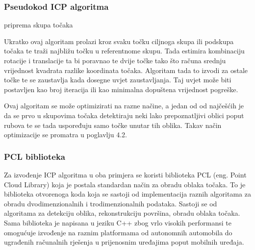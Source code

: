 \subsubsection{Pseudokod ICP algoritma}

\begin{algorithm}[h!]
\SetAlgoLined
{}
 priprema skupa točaka\;
\end{algorithm}

Ukratko ovaj algoritam prolazi kroz svaku točku ciljnoga skupa ili podskupa točaka te traži najbližu točku u referentnome skupu. Tada estimira kombinaciju rotacije i translacije ta bi poravnao te dvije točke tako što računa srednju vrijednost kvadrata razlike koordinata točaka. Algoritam tada to izvodi za ostale točke te se zaustavlja kada dosegne uvjet zaustavljanja. Taj uvjet može biti postavljen kao broj iteracija ili kao minimalna dopuštena vrijednost pogreške.

Ovaj algoritam se može optimizirati na razne načine, a jedan od od najčešćih je da se prvo u skupovima točaka detektiraju neki lako prepoznatljivi oblici poput rubova te se tada uspoređuju samo točke unutar tih oblika. Takav način optimizacije se promatra u poglavlju 4.2.

\subsubsection{PCL biblioteka}

Za izvođenje ICP algoritma u oba primjera se koristi biblioteka PCL (eng. Point Cloud Library) koja je postala standardan način za obradu oblaka točaka. To je biblioteka otvorenoga koda koja se sastoji od implementacija raznih algoritama za obradu dvodimenzionalnih i trodimenzionalnih podataka. Sastoji se od algoritama za detekciju oblika, rekonstrukciju površina, obradu oblaka točaka. Sama biblioteka je napisana u jeziku C++ zbog vrlo visokih performansi te omogućuje izvođenje na raznim platformama od autonomnih automobila do ugrađenih računalnih rješenja u prijenosnim uređajima poput mobilnih uređaja.